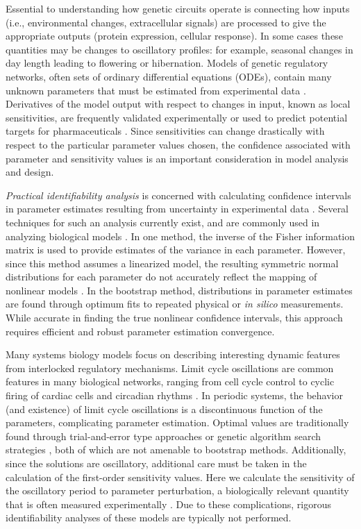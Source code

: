 Essential to understanding how genetic circuits operate is connecting how
inputs (i.e., environmental changes, extracellular signals) are processed to
give the appropriate outputs (protein expression, cellular response). In some
cases these quantities may be changes to oscillatory profiles: for example,
seasonal changes in day length leading to flowering or hibernation. Models of
genetic regulatory networks, often sets of ordinary differential equations
(ODEs), contain many unknown parameters that must be estimated from
experimental data \cite{Gutenkunst2007}. Derivatives of the model output with
respect to changes in input, known as local sensitivities, are frequently
validated experimentally or used to predict potential targets for
pharmaceuticals \cite{Kell2006}. Since sensitivities can change drastically
with respect to the particular parameter values chosen, the confidence
associated with parameter and sensitivity values is an important consideration
in model analysis and design.

{\itshape Practical identifiability analysis} is concerned with calculating
confidence intervals in parameter estimates resulting from uncertainty in
experimental data \cite{Raue2009}. Several techniques for such an analysis
currently exist, and are commonly used in analyzing biological models
\cite{Nihtila1977, Jimenez-Hornero2009, Holmberg1982}.  In one method, the
inverse of the Fisher information matrix is used to provide estimates of the
variance in each parameter. However, since this method assumes a linearized
model, the resulting symmetric normal distributions for each parameter do not
accurately reflect the mapping of nonlinear models \cite{Joshi2006}. In the
bootstrap method, distributions in parameter estimates are found through optimum
fits to repeated physical or {\itshape in silico} measurements. While accurate
in finding the true nonlinear confidence intervals, this approach requires
efficient and robust parameter estimation convergence.

Many systems biology models focus on describing interesting dynamic features
from interlocked regulatory mechanisms. Limit cycle oscillations are common
features in many biological networks, ranging from cell cycle control to cyclic
firing of cardiac cells and circadian rhythms \cite{Goldbeter1996}. In periodic
systems, the behavior (and existence) of limit cycle oscillations is a
discontinuous function of the parameters, complicating parameter estimation.
Optimal values are traditionally found through trial-and-error type approaches
\cite{Forger2003, Leloup2003} or genetic algorithm search strategies
\cite{Mirsky2009}, both of which are not amenable to bootstrap methods.
Additionally, since the solutions are oscillatory, additional care
must be taken in the calculation of the first-order sensitivity values. Here we
calculate the sensitivity of the oscillatory period to parameter perturbation, a
biologically relevant quantity that is often measured experimentally
\cite{Wilkins2009}. Due to these complications, rigorous identifiability
analyses of these models are typically not performed.

